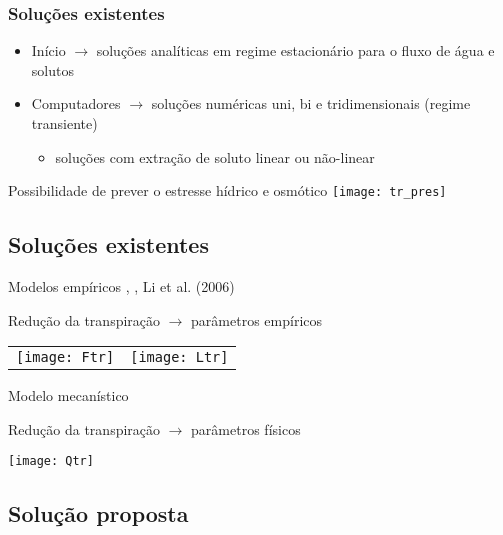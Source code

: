 \begin{frame}\frametitle{Soluções existentes}
    \begin{itemize}
    \item Início $\rightarrow$ soluções analíticas em regime estacionário para o fluxo de água e solutos
    \item Computadores $\rightarrow$ soluções numéricas uni, bi e tridimensionais (regime transiente)
      \begin{itemize}
	\item soluções com extração de soluto linear ou não-linear
      \end{itemize}
  \end{itemize}
  \centering
  Possibilidade de prever o estresse hídrico e osmótico
  \texttt{[image: tr\_pres]}\\
\end{frame}

\subsection{Soluções existentes}
\scriptsize
\begin{frame}
  \begin{block}{Modelos empíricos}
    \cite{feddes78}, \cite{homaee}, Li et al. (2006)

    Redução da transpiração $\rightarrow$ parâmetros empíricos

    \centering
    \begin{tabular}{cc}
      \texttt{[image: Ftr]} &
      \texttt{[image: Ltr]} \\
    \end{tabular}
  \end{block}
  
  \begin{block}{Modelo mecanístico}
    \cite{liersolute}

    Redução da transpiração $\rightarrow$ parâmetros físicos
    
    \centering
    \texttt{[image: Qtr]}
  \end{block}
\end{frame}


\subsection{Solução proposta}
  
